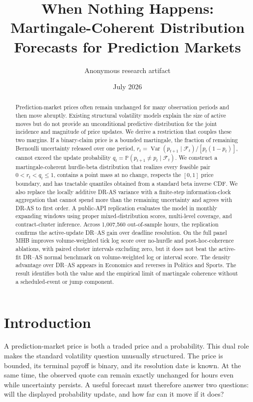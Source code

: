 \documentclass[11pt]{article}
\title{When Nothing Happens:\\Martingale-Coherent Distribution Forecasts for Prediction Markets}
\author{Anonymous research artifact}
\date{July 2026}
\newcommand{\Pp}{\mathbb P}
\newcommand{\Var}{\operatorname{Var}}
\newcommand{\1}{\mathbb I}
\newcommand{\F}{\mathcal F}
\begin{document}
\maketitle

\begin{abstract}
Prediction-market prices often remain unchanged for many observation periods and
then move abruptly. Existing structural volatility models explain the size of
active moves but do not provide an unconditional predictive distribution for
the joint incidence and magnitude of price updates. We derive a restriction
that couples these two margins. If a binary-claim price is a bounded martingale,
the fraction of remaining Bernoulli uncertainty released over one period,
$r_t=\Var(p_{t+1}\mid\F_t)/[p_t(1-p_t)]$, cannot exceed the update probability
$q_t=\Pp(p_{t+1}\ne p_t\mid\F_t)$. We construct a martingale-coherent
hurdle-beta distribution that realizes every feasible pair $0<r_t<q_t\le1$,
contains a point mass at no change, respects the $[0,1]$ price boundary, and has
tractable quantiles obtained from a standard beta inverse CDF. We also replace the locally additive DR-AS variance with
a finite-step information-clock aggregation that cannot spend more than the
remaining uncertainty and agrees with DR-AS to first order. A public-API
replication evaluates the model in monthly expanding windows using proper
mixed-distribution scores, multi-level coverage, and contract-cluster
inference. Across 1,007,560 out-of-sample hours, the replication confirms the
active-update DR--AS gain over deadline resolution. On the full panel MHB
improves volume-weighted tick log score over no-hurdle and post-hoc-coherence
ablations, with paired cluster intervals excluding zero, but it does not beat
the active-fit DR--AS normal benchmark on volume-weighted log or interval score.
The density advantage over DR--AS appears in Economics and reverses in Politics
and Sports. The result identifies both the value and the empirical limit of
martingale coherence without a scheduled-event or jump component.
\end{abstract}

\section{Introduction}

A prediction-market price is both a traded price and a probability. This dual
role makes the standard volatility question unusually structured. The price is
bounded, its terminal payoff is binary, and its resolution date is known. At
the same time, the observed quote can remain exactly unchanged for hours even
while uncertainty persists. A useful forecast must therefore answer two
questions: will the displayed probability update, and how far can it move if it
does?
\end{document}
